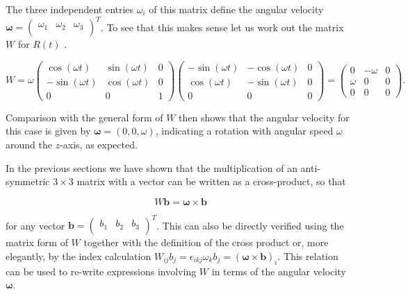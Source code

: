 \documentclass[a4paper,12pt]{report}
\begin{document}
The three independent entries \(\omega_i\) of this matrix define the angular velocity \(\boldsymbol{\omega} = \begin{pmatrix}
    \omega _{1}  & \omega _{2}  & \omega _{3}   \\
\end{pmatrix}^T\). To see that this makes sense let us work out the matrix \( W \) for \(R(t)\) .

\begin{equation}
W = \omega
\begin{pmatrix}
\cos(\omega t) & \sin(\omega t) & 0 \\
-\sin(\omega t) & \cos(\omega t) & 0 \\
0 & 0 & 1
\end{pmatrix}
\begin{pmatrix}
-\sin(\omega t) & -\cos(\omega t) & 0 \\
\cos(\omega t) & -\sin(\omega t) & 0 \\
0 & 0 & 0
\end{pmatrix}
=
\begin{pmatrix}
0 & -\omega & 0 \\
\omega & 0 & 0 \\
0 & 0 & 0
\end{pmatrix}
.
\end{equation}

Comparison with the general form of \( W \) then shows that the angular velocity for this case is given by \(\boldsymbol{\omega} = (0, 0, \omega)\), indicating a rotation with angular speed \(\omega\) around the \( z \)-axis, as expected.

In the previous sections we have shown that the multiplication of an anti-symmetric \(3 \times 3\) matrix with a vector can be written as a cross-product, so that

\begin{equation}
W \mathbf{b} = \boldsymbol{\omega} \times \mathbf{b}
\end{equation}

for any vector \(\mathbf{b} = \begin{pmatrix}
    b_1  & b_2  & b_3   \\
\end{pmatrix}^T\). This can also be directly verified using the matrix form of \( W \) together with the definition of the cross product or, more elegantly, by the index calculation \( W_{ij} b_j = \epsilon_{ikj} \omega_k b_j = (\boldsymbol{\omega} \times \mathbf{b})_i \). This relation can be used to re-write expressions involving \( W \) in terms of the angular velocity \(\boldsymbol{\omega}\).
\end{document}
